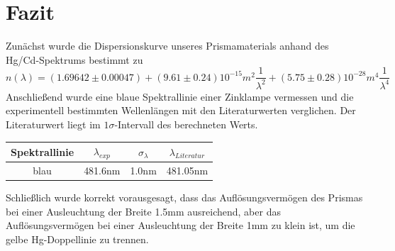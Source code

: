 \documentclass[12pt,a4paper]{article}
\begin{document}
\section{Fazit}
Zunächst wurde die Dispersionskurve unseres Prismamaterials anhand des Hg/Cd-Spektrums bestimmt zu
\begin{equation}
n(\lambda)=(1.69642\pm0.00047)+(9.61\pm0.24)10^{-15}m^2\frac{1}{\lambda^2}+(5.75\pm0.28)10^{-28}m^4\frac{1}{\lambda^4}
\end{equation}
Anschließend wurde eine blaue Spektrallinie einer Zinklampe vermessen und die experimentell bestimmten Wellenlängen mit den Literaturwerten verglichen. Der Literaturwert liegt im $1\sigma$-Intervall des berechneten Werts.
\begin{center}
\begin{tabular}{|c|c|c|c|}
 	\hline
 	Spektrallinie & $\lambda_{exp}$&$\sigma_{\lambda}$&$\lambda_{Literatur}$\\
 	\hline
 	blau&481.6nm&1.0nm&481.05nm\\
 	\hline
\end{tabular}
\end{center}Schließlich wurde korrekt vorausgesagt, dass das Auflösungsvermögen des Prismas bei einer Ausleuchtung der Breite 1.5mm ausreichend, aber das Auflösungsvermögen bei einer Ausleuchtung der Breite 1mm zu klein ist, um die gelbe Hg-Doppellinie zu trennen.
\end{document}
